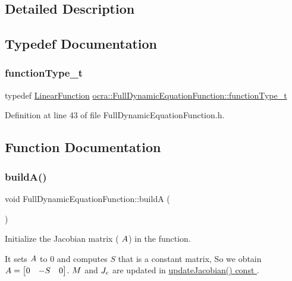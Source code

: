 \subsection{Detailed Description}


\subsection{Typedef Documentation}
\hypertarget{group__constraint_ga3f72eb3c4529d2c19ef39928f5e57262}{}\label{group__constraint_ga3f72eb3c4529d2c19ef39928f5e57262} 
\subsubsection{\texorpdfstring{function\+Type\+\_\+t}{functionType\_t}}
{\footnotesize\ttfamily typedef \hyperlink{classocra_1_1LinearFunction}{Linear\+Function} \hyperlink{group__constraint_ga3f72eb3c4529d2c19ef39928f5e57262}{ocra\+::\+Full\+Dynamic\+Equation\+Function\+::function\+Type\+\_\+t}}



Definition at line 43 of file Full\+Dynamic\+Equation\+Function.\+h.



\subsection{Function Documentation}
\hypertarget{group__constraint_ga19d9bbe4f78b4c396930388a70b8cd4b}{}\label{group__constraint_ga19d9bbe4f78b4c396930388a70b8cd4b} 
\subsubsection{\texorpdfstring{build\+A()}{buildA()}}
{\footnotesize\ttfamily void Full\+Dynamic\+Equation\+Function\+::buildA (\begin{DoxyParamCaption}{ }\end{DoxyParamCaption})\hspace{0.3cm}{\ttfamily [protected]}}

Initialize the Jacobian matrix ( $ A $) in the function.

It sets $ A $ to 0 and computes $ S $ that is a constant matrix, So we obtain $ A = \begin{bmatrix} 0 & -S & 0 \end{bmatrix} $. $ M $ and $ J_c $ are updated in \hyperlink{group__constraint_ga5b4ea2e9706cd848923c835e2df0eff5}{update\+Jacobian() const }. 

